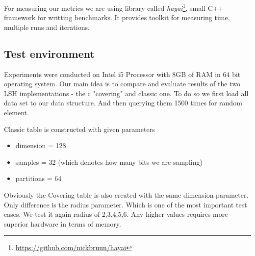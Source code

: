 For measuring our metrics we are using library called \textit{hayai}\footnote{\url{https://github.com/nickbruun/hayai}}, small C++ framework for writting benchmarks. It provides toolkit for measuring time, multiple runs and iterations.

\subsection{Test environment}

Experiments were conducted on Intel i5 Processor with 8GB of RAM in 64 bit operating system. Our main idea is to compare and evaluate results of the two LSH implementations - the c "covering" and classic one. To do so we first load all data set to our data structure. And then querying them 1500 times for random element.

Classic table is constructed with given parameters

\begin{itemize}
  \item dimension = 128
  \item samples = 32 (which denotes how many bits we are sampling)
  \item partitions = 64
\end{itemize}

Obviously the Covering table is also created with the same dimension parameter. Only difference is the radius parameter. Which is one of the most important test cases. We test it again radius of 2,3,4,5,6. Any higher values requires more superior hardware in terms of memory.
